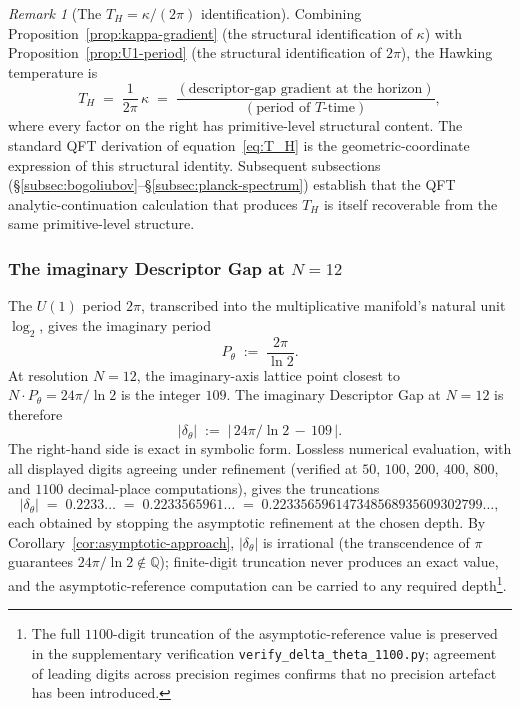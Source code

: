 \documentclass[11pt,a4paper]{article}
\theoremstyle{definition}
\theoremstyle{remark}
\newtheorem{remark}[theorem]{Remark}
\begin{document}
\begin{remark}[The $T_{H} = \kappa/(2\pi)$ identification]\label{rem:T_H-structural}
Combining Proposition~\ref{prop:kappa-gradient} (the structural identification of $\kappa$) with Proposition~\ref{prop:U1-period} (the structural identification of $2\pi$), the Hawking temperature is
\[
T_{H} \;=\; \frac{1}{2\pi}\, \kappa \;=\; \frac{(\text{descriptor-gap gradient at the horizon})}{(\text{period of $T$-time})},
\]
where every factor on the right has primitive-level structural content. The standard QFT derivation of equation~\eqref{eq:T_H} is the geometric-coordinate expression of this structural identity. Subsequent subsections (\S\ref{subsec:bogoliubov}--\S\ref{subsec:planck-spectrum}) establish that the QFT analytic-continuation calculation that produces $T_{H}$ is itself recoverable from the same primitive-level structure.
\end{remark}

\subsubsection*{The imaginary Descriptor Gap at $N=12$}

The $U(1)$ period $2\pi$, transcribed into the multiplicative manifold's natural unit $\log_{2}$, gives the imaginary period
\begin{equation}\label{eq:imag-period}
P_{\theta} \;:=\; \frac{2\pi}{\ln 2}.
\end{equation}
At resolution $N = 12$, the imaginary-axis lattice point closest to $N\cdot P_{\theta} = 24\pi/\ln 2$ is the integer $109$. The imaginary Descriptor Gap at $N=12$ is therefore
\begin{equation}\label{eq:delta-theta}
|\delta_{\theta}| \;:=\; \bigl|\,24\pi/\ln 2 \,-\, 109\,\bigr|.
\end{equation}
The right-hand side is exact in symbolic form. Lossless numerical evaluation, with all displayed digits agreeing under refinement (verified at $50$, $100$, $200$, $400$, $800$, and $1100$ decimal-place computations), gives the truncations
\[
|\delta_{\theta}| \;=\; 0.2233\ldots \;=\; 0.2233565961\ldots \;=\; 0.223356596147348568935609302799\ldots,
\]
each obtained by stopping the asymptotic refinement at the chosen depth. By Corollary~\ref{cor:asymptotic-approach}, $|\delta_{\theta}|$ is irrational (the transcendence of $\pi$ guarantees $24\pi/\ln 2 \notin \mathbb{Q}$); finite-digit truncation never produces an exact value, and the asymptotic-reference computation can be carried to any required depth\footnote{The full $1100$-digit truncation of the asymptotic-reference value is preserved in the supplementary verification \texttt{verify\_delta\_theta\_1100.py}; agreement of leading digits across precision regimes confirms that no precision artefact has been introduced.}.
\end{document}
